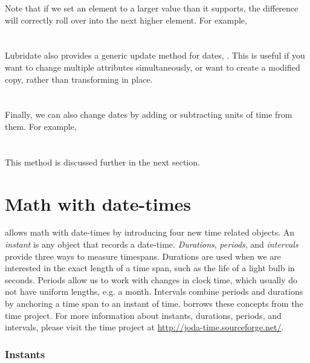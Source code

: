 \documentclass[article]{jss}
\begin{document}
Note that if we set an element to a larger value than it supports, the difference will correctly roll over into the next higher element. For example,\\

\\
\\

Lubridate also provides a generic update method for dates, .  This is useful if you want to change multiple attributes simultaneously, or want to create a modified copy, rather than transforming in place.\\

\\
\\

Finally, we can also change dates by adding or subtracting units of time from them. For example,\\

\\
\\

This method is discussed further in the next section.


\section{Math with date-times}
\label{sec:types}
 allows math with date-times by introducing four new time related objects. An \emph{instant} is any object that records a date-time. \emph{Durations}, \emph{periods}, and \emph{intervals} provide three ways to measure timespans. Durations are used when we are interested in the exact length of a time span, such as the life of a light bulb in seconds. Periods allow us to work with changes in clock time, which usually do not have uniform lengths, e.g. a month. Intervals combine periods and durations by anchoring a time span to an instant of time.  borrows these concepts from the  time project. For more information about instants, durations, periods, and intervals, please visit the  time project at  \url{http://joda-time.sourceforge.net/}. 

\subsubsection{Instants}
\label{sec:instants}
\end{document}
